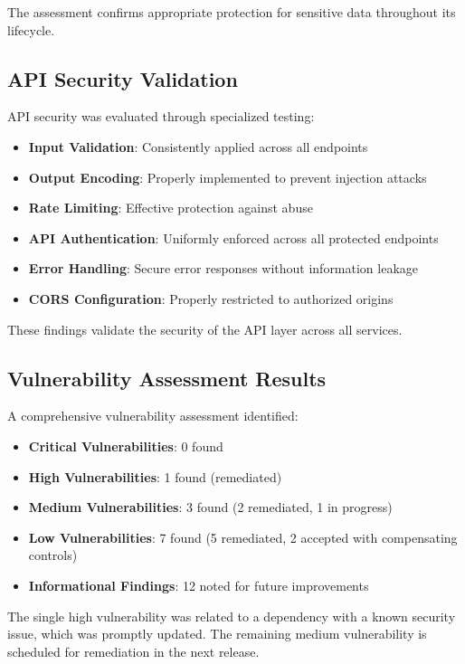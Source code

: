The assessment confirms appropriate protection for sensitive data throughout its lifecycle.

\subsection{API Security Validation}

API security was evaluated through specialized testing:

\begin{itemize}
    \item \textbf{Input Validation}: Consistently applied across all endpoints
    \item \textbf{Output Encoding}: Properly implemented to prevent injection attacks
    \item \textbf{Rate Limiting}: Effective protection against abuse
    \item \textbf{API Authentication}: Uniformly enforced across all protected endpoints
    \item \textbf{Error Handling}: Secure error responses without information leakage
    \item \textbf{CORS Configuration}: Properly restricted to authorized origins
\end{itemize}

These findings validate the security of the API layer across all services.

\subsection{Vulnerability Assessment Results}

A comprehensive vulnerability assessment identified:

\begin{itemize}
    \item \textbf{Critical Vulnerabilities}: 0 found
    \item \textbf{High Vulnerabilities}: 1 found (remediated)
    \item \textbf{Medium Vulnerabilities}: 3 found (2 remediated, 1 in progress)
    \item \textbf{Low Vulnerabilities}: 7 found (5 remediated, 2 accepted with compensating controls)
    \item \textbf{Informational Findings}: 12 noted for future improvements
\end{itemize}

The single high vulnerability was related to a dependency with a known security issue, which was promptly updated. The remaining medium vulnerability is scheduled for remediation in the next release.

